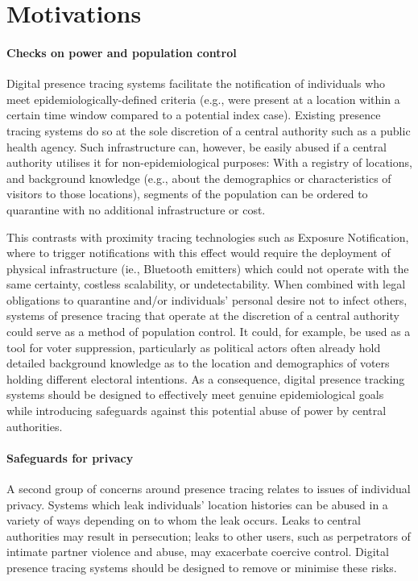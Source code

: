 \section{Motivations}
\paragraph{Checks on power and population control}
Digital presence tracing systems facilitate the notification of individuals who meet epidemiologically-defined criteria (e.g., were present at a location within a certain time window compared to a potential index case). Existing presence tracing systems do so at the sole discretion of a central authority such as a public health agency. Such infrastructure can, however, be easily abused if a central authority utilises it for non-epidemiological purposes: With a registry of locations, and background knowledge (e.g., about the demographics or characteristics of visitors to those locations), segments of the population can be ordered to quarantine with no additional infrastructure or cost.

This contrasts with proximity tracing technologies such as Exposure Notification, where to trigger notifications with this effect would require the deployment of physical infrastructure (ie., Bluetooth emitters) which could not operate with the same certainty, costless scalability, or undetectability. When combined with legal obligations to quarantine and/or individuals' personal desire not to infect others, systems of presence tracing that operate at the discretion of a central authority could serve as a method of population control. It could, for example, be used as a tool for voter suppression, particularly as political actors often already hold detailed background knowledge as to the location and demographics of voters holding different electoral intentions. As a consequence, digital presence tracking systems should be designed to effectively meet genuine epidemiological goals while introducing safeguards against this potential abuse of power by central authorities.

\paragraph{Safeguards for privacy}
A second group of concerns around presence tracing relates to issues of individual privacy. Systems which leak individuals’ location histories can be abused in a variety of ways depending on to whom the leak occurs. Leaks to central authorities may result in persecution; leaks to other users, such as perpetrators of intimate partner violence and abuse, may exacerbate coercive control. Digital presence tracing systems should be designed to remove or minimise these risks.

